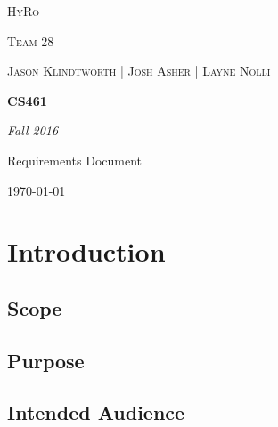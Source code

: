 \documentclass[10pt,draftclsnofoot,onecolumn,compsoc]{IEEEtran}
\begin{document}
\begin{titlepage}
	\centering
	{\scshape\LARGE HyRo \par}
	{\scshape\LARGE Team 28\par}
	\vspace{1cm}
	{\scshape\Large Jason Klindtworth  |  Josh Asher  |   Layne Nolli}
	\noindent\makebox[\linewidth]{\rule{17cm}{2pt}}
	\vspace{1cm}
	{\huge\bfseries CS461\par}
	\vspace{2cm}
	{\Large\itshape Fall 2016\par}
	\vspace{4cm}
	{\large Requirements Document\par}\vspace{8cm}
	\noindent\makebox[\linewidth]{\rule{17cm}{2pt}}
	\vfill

	{\large \today\par}
\end{titlepage}


\setcounter{tocdepth}{2}
\tableofcontents
\newpage

\section{Introduction}
\subsection{Scope}
\subsection{Purpose}
\subsection{Intended Audience}
\end{document}
